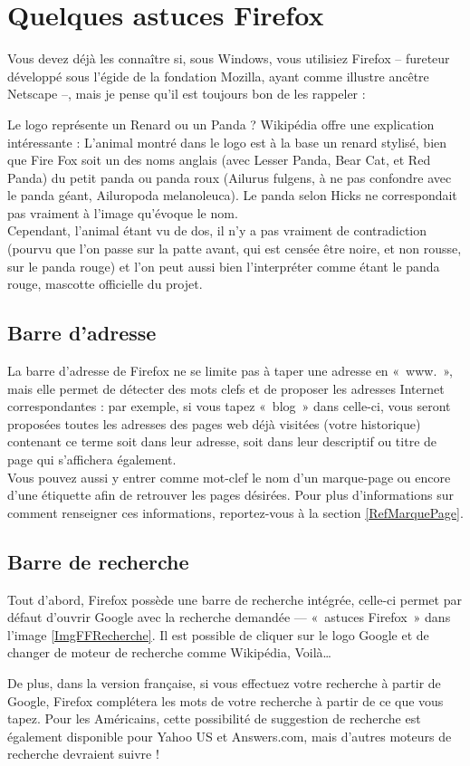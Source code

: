 \section{Quelques astuces Firefox}
\label{RefFF}
Vous devez déjà les connaître si, sous Windows, vous utilisiez Firefox -- fureteur développé sous l'égide de la fondation Mozilla, ayant comme illustre ancêtre Netscape --, mais je pense qu'il est toujours bon de les rappeler :
\begin{citationlongue}{Le logo représente un Renard ou un Panda ? Wikipédia offre une explication intéressante :}
L'animal montré dans le logo est à la base un renard stylisé, bien que Fire Fox soit un des noms anglais (avec Lesser Panda, Bear Cat, et Red Panda) du petit panda ou panda roux (Ailurus fulgens, à ne pas confondre avec le panda géant, Ailuropoda melanoleuca). Le panda selon Hicks ne correspondait pas vraiment à l'image qu'évoque le nom.\\ Cependant, l'animal étant vu de dos, il n'y a pas vraiment de contradiction (pourvu que l'on passe sur la patte avant, qui est censée être noire, et non rousse, sur le panda rouge) et l'on peut aussi bien l'interpréter comme étant le panda rouge, mascotte officielle du projet.
\end{citationlongue}
\subsection{Barre d'adresse}
\label{RefBarreAdresse}
La barre d'adresse de Firefox ne se limite pas à taper une adresse en «~www.~», mais elle permet de détecter des mots clefs et de proposer les adresses Internet correspondantes : par exemple, si vous tapez «~blog~» dans celle-ci, vous seront proposées toutes les adresses des pages web déjà visitées (votre historique) contenant ce terme soit dans leur adresse, soit dans leur descriptif ou titre de page qui s'affichera également.\\
Vous pouvez aussi y entrer comme mot-clef le nom d'un marque-page ou encore d'une étiquette afin de retrouver les pages désirées. Pour plus d'informations sur comment renseigner ces informations, reportez-vous à la section \ref{RefMarquePage}.\par
\subsection{Barre de recherche}
Tout d'abord, Firefox possède une barre de recherche intégrée, celle-ci permet par défaut d'ouvrir Google avec la recherche demandée --- «~astuces Firefox~» dans l'image \ref{ImgFFRecherche}. Il est possible de cliquer sur le logo Google et de changer de moteur de recherche comme Wikipédia, Voilà\ldots{}\par
{}
De plus, dans la version française, si vous effectuez votre recherche à partir de Google, Firefox complétera les mots de votre recherche à partir de ce que vous tapez. Pour les Américains, cette possibilité de suggestion de recherche est également disponible pour Yahoo US et Answers.com, mais d'autres moteurs de recherche devraient suivre !
